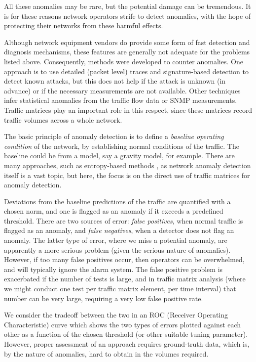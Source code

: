 All these anomalies may be rare, but the potential damage can be
tremendous. It is for these reasons network operators strife to detect
anomalies, with the hope of protecting their networks from these
harmful effects. 

Although network equipment vendors do provide some form of fast
detection and diagnosis mechanisms, these features are generally not
adequate for the problems listed above. Consequently, methods were
developed to counter anomalies. One approach is to use detailed
(packet level) traces and signature-based detection to detect known
attacks, but this does not help if the attack is unknown (in advance)
or if the necessary measurements are not available. Other techniques
infer statistical anomalies from the traffic flow data or SNMP
measurements. Traffic matrices play an important role in this respect,
since these matrices record traffic volumes across a whole network.

The basic principle of anomaly detection is to define a \emph{baseline
  operating condition} of the network, by establishing normal
conditions of the traffic. The baseline could be from a model, say a
gravity model, for example. There are many approaches, such as
entropy-based methods \cite{Brauckhoff09Anomaly,Gu05Entropy}, as
network anomaly detection itself is a vast topic, but here, the focus
is on the direct use of traffic matrices for anomaly detection.

Deviations from the baseline predictions of the traffic are quantified
with a chosen norm, and one is flagged as an anomaly if it exceeds a
predefined threshold. There are two sources of error: \emph{false
  positives}, when normal traffic is flagged as an anomaly, and
\emph{false negatives}, when a detector does not flag an anomaly.  The
latter type of error, where we miss a potential anomaly, are
apparently a more serious problem (given the serious nature of
anomalies). However, if too many false positives occur, then operators
can be overwhelmed, and will typically ignore the alarm system. The
false positive problem is exacerbated if the number of tests is large,
and in traffic matrix analysis (where we might conduct one test per
traffic matrix element, per time interval) that number can be very
large, requiring a very low false positive rate. 

We consider the tradeoff between the two in an ROC (Receiver Operating
Characteristic) curve which shows the two types of errors plotted
against each other as a function of the chosen threshold (or other
suitable tuning parameter). However, proper assessment of an approach
requires ground-truth data, which is, by the nature of anomalies, hard
to obtain in the volumes required.

